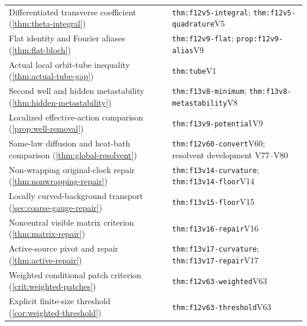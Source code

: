 \documentclass[11pt,oneside,openany]{book}
\theoremstyle{definition}
\theoremstyle{remark}
\begin{document}
\begin{longtable}{L{0.32\textwidth}L{0.12\textwidth}L{0.477\textwidth}}
Differentiated transverse coefficient (\cref{thm:theta-integral}) & \cite{F12} & \nolinkurl{thm:f12v5-integral}; \nolinkurl{thm:f12v5-quadrature}\newline V5 \\
Flat identity and Fourier aliases (\cref{thm:flat-bloch}) & \cite{F12} & \nolinkurl{thm:f12v9-flat}; \nolinkurl{prop:f12v9-alias}\newline V9 \\
Actual local orbit-tube inequality (\cref{thm:actual-tube-gap}) & \cite{F13} & \nolinkurl{thm:tube}\newline V1 \\
Second well and hidden metastability (\cref{thm:hidden-metastability}) & \cite{F13} & \nolinkurl{thm:f13v8-minimum}; \nolinkurl{thm:f13v8-metastability}\newline V8 \\
Localized effective-action comparison (\cref{prop:well-removal}) & \cite{F13} & \nolinkurl{thm:f13v9-potential}\newline V9 \\
Same-law diffusion and heat-bath comparison (\cref{thm:global-resolvent}) & \cite{F12} & \nolinkurl{thm:f12v60-convert}\newline V60; resolvent development V77--V80 \\
Non-wrapping original-clock repair (\cref{thm:nonwrapping-repair}) & \cite{F13} & \nolinkurl{thm:f13v14-curvature}; \nolinkurl{thm:f13v14-floor}\newline V14 \\
Locally curved-background transport (\cref{sec:coarse-gauge-repair}) & \cite{F13} & \nolinkurl{thm:f13v15-floor}\newline V15 \\
Noncentral visible matrix criterion (\cref{thm:matrix-repair}) & \cite{F13} & \nolinkurl{thm:f13v16-repair}\newline V16 \\
Active-source pivot and repair (\cref{thm:active-repair}) & \cite{F13} & \nolinkurl{thm:f13v17-curvature}; \nolinkurl{thm:f13v17-repair}\newline V17 \\
Weighted conditional patch criterion (\cref{crit:weighted-patches}) & \cite{F12} & \nolinkurl{thm:f12v63-weighted}\newline V63 \\
Explicit finite-size threshold (\cref{cor:weighted-threshold}) & \cite{F12} & \nolinkurl{thm:f12v63-threshold}\newline V63 \\
\bottomrule
\end{longtable}
\normalsize
\end{document}
